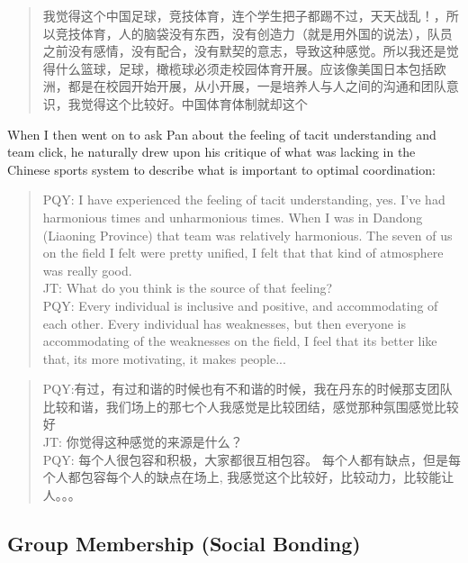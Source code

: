 \begin{CJK}{UTF8}{gbsn}
\begin{quotation}
  我觉得这个中国足球，竞技体育，连个学生把子都踢不过，天天战乱！，所以竞技体育，人的脑袋没有东西，没有创造力（就是用外国的说法），队员之前没有感情，没有配合，没有默契的意志，导致这种感觉。所以我还是觉得什么篮球，足球，橄榄球必须走校园体育开展。应该像美国日本包括欧洲，都是在校园开始开展，从小开展，一是培养人与人之间的沟通和团队意识，我觉得这个比较好。中国体育体制就却这个
\end{quotation}

When I then went on to ask Pan about the feeling of tacit understanding and team click, he naturally drew upon his critique of what was lacking in the Chinese sports system to describe what is important to optimal coordination:


\begin{quotation}
  PQY: I have experienced the feeling of tacit understanding, yes. I've had harmonious times and unharmonious times. When I was in Dandong (Liaoning Province) that team was relatively harmonious.  The seven of us on the field I felt were pretty unified, I felt that that kind of atmosphere was really good. \\
  JT: What do you think is the source of that feeling? \\
  PQY: Every individual is inclusive and positive, and accommodating of each other. Every individual has weaknesses, but then everyone is accommodating of the weaknesses on the field, I feel that its better like that, its more motivating, it makes people...
\end{quotation}

\begin{quotation}
  PQY:有过，有过和谐的时候也有不和谐的时候，我在丹东的时候那支团队比较和谐，我们场上的那七个人我感觉是比较团结，感觉那种氛围感觉比较好 \\
  JT: 你觉得这种感觉的来源是什么？\\
  PQY: 每个人很包容和积极，大家都很互相包容。 每个人都有缺点，但是每个人都包容每个人的缺点在场上, 我感觉这个比较好，比较动力，比较能让人。。。
\end{quotation}






\clearpage
\subsection{Group Membership (Social Bonding)}


\end{CJK}
